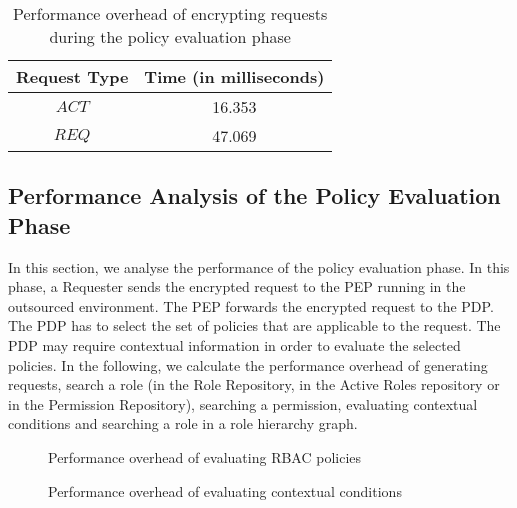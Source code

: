 \documentclass[final,5p,times,twocolumn]{elsarticle}
\begin{document}
\begin{table}[htp]
\centering
\caption{Performance overhead of encrypting requests during the policy evaluation phase}
\label{tab:request}
{\small
\begin{tabular}{ |c|c| }
\hline
\textbf{Request Type} & \textbf{Time (in milliseconds)} \\ \hline
$\mathit{ACT}$ & 16.353 \\ \hline
$\mathit{REQ}$ & 47.069 \\ \hline
\end{tabular}
}
\end{table} 
\subsection{Performance Analysis of the Policy Evaluation Phase}
\label{sec:policy-evaluation}

In this section, we analyse the performance of the policy evaluation phase. In this phase, a Requester sends the encrypted request to the PEP running in the outsourced environment. The PEP forwards the encrypted request to the PDP. The PDP has to select the set of policies that are applicable to the request. The PDP may require contextual information in order to evaluate the selected policies. In the following, we calculate the performance overhead of generating requests, search a role (in the Role Repository, in the Active Roles repository or in the Permission Repository), searching a permission, evaluating contextual conditions and searching a role in a role hierarchy graph.

\begin{figure*}
\centering
{}
\caption{Performance overhead of evaluating RBAC policies}
\label{fig:policy-evaluation-rbac-policy}
\end{figure*}


\begin{figure*}
\centering
{}
\caption{Performance overhead of evaluating contextual conditions}
\label{fig:policy-evaluation-context}
\end{figure*}
\end{document}
